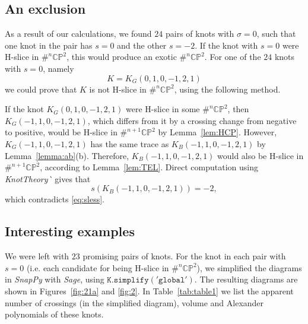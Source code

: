 \documentclass [11pt]{amsart}
\theoremstyle{remark}
\def\CP{\mathbb{CP}^2}
\begin{document}
\subsection{An exclusion}
As a result of our calculations, we found $24$ pairs of knots with $\sigma=0$, such that one knot in the pair has $s=0$ and the other $s=-2$. If the knot with $s=0$ were H-slice in $\#^n \CP$, this would produce an exotic $\#^n \CP$. For one of the $24$ knots with $s=0$, namely
$$K= K_G(0,1,0,-1,2,1) $$
we could prove that $K$ is not H-slice in $\#^n \CP$, using the following method.

If the knot $K_G(0,1,0,-1,2,1)$ were H-slice in some $\#^n \CP$, then $K_G(-1,1,0,-1,2,1)$, which differs from it by a crossing change from negative to positive, would be H-slice in $\#^{n+1} \CP$ by Lemma~\ref{lem:HCP}. However, $K_G(-1,1,0,-1,2,1)$ has the same trace as $K_B(-1,1,0,-1,2,1)$ by Lemma~\ref{lemma:ab}(b). Therefore, $K_B(-1,1,0,-1,2,1)$ would also be H-slice in $\#^{n+1} \CP$, according to Lemma~\ref{lem:TEL}. Direct computation using \emph{KnotTheory\!\`{}} gives that 
$$s(K_B(-1,1,0,-1,2,1)) = -2,$$
which contradicts \eqref{eq:sless}.

\subsection{Interesting examples} 
We were left with $23$ promising pairs of knots. For the knot in each pair with $s=0$ (i.e. each candidate for being H-slice in $\#^n \CP$), we simplified the diagrams in {\em SnapPy} with {\em Sage}, using $\mathtt{K.simplify('global')}$. The resulting diagrams are shown in Figures~\ref{fig:21a} and \ref{fig:2}. In Table~\ref{tab:table1} we list the apparent number of crossings (in the simplified diagram), volume and Alexander polynomials of these knots. 
\end{document}
